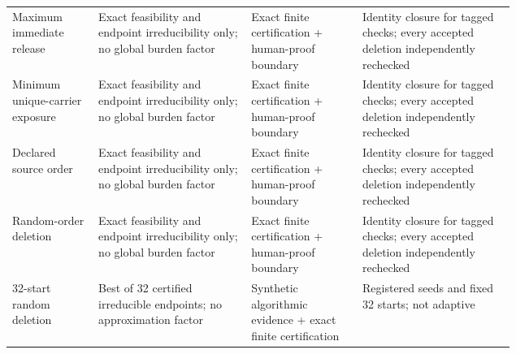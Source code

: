{\begin{longtable}{p{0.12\linewidth}p{0.22\linewidth}p{0.16\linewidth}p{0.22\linewidth}}
Maximum immediate release & Exact feasibility and endpoint irreducibility only; no global burden factor & Exact finite certification + human-proof boundary & Identity closure for tagged checks; every accepted deletion independently rechecked \\
Minimum unique-carrier exposure & Exact feasibility and endpoint irreducibility only; no global burden factor & Exact finite certification + human-proof boundary & Identity closure for tagged checks; every accepted deletion independently rechecked \\
Declared source order & Exact feasibility and endpoint irreducibility only; no global burden factor & Exact finite certification + human-proof boundary & Identity closure for tagged checks; every accepted deletion independently rechecked \\
Random-order deletion & Exact feasibility and endpoint irreducibility only; no global burden factor & Exact finite certification + human-proof boundary & Identity closure for tagged checks; every accepted deletion independently rechecked \\
32-start random deletion & Best of 32 certified irreducible endpoints; no approximation factor & Synthetic algorithmic evidence + exact finite certification & Registered seeds and fixed 32 starts; not adaptive \\
\bottomrule
\end{longtable}
}
